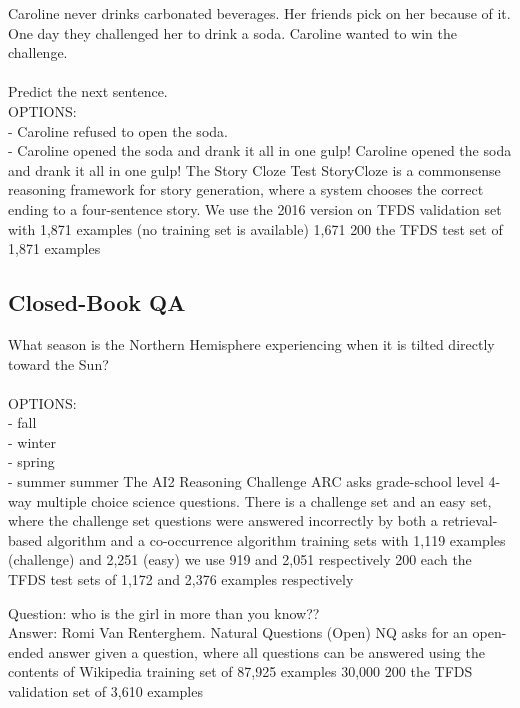 \taskio
{Caroline never drinks carbonated beverages. Her friends pick on her because of it. One day they challenged her to drink a soda. Caroline wanted to win the challenge.\\\\Predict the next sentence.\\OPTIONS:\\- Caroline refused to open the soda.\\- Caroline opened the soda and drank it all in one gulp!}
{Caroline opened the soda and drank it all in one gulp!}
{
    \taskdescription
    {The Story Cloze Test} %
    {StoryCloze} %
    {\citep{mostafazadeh-etal-2016-corpus}} %
    {is a commonsense reasoning framework for story generation, where a system chooses the correct ending to a four-sentence story. We use the 2016 version on TFDS} %
    {validation set with 1,871 examples (no training set is available)} %
    {1,671} %
    {200} %
    {the TFDS test set of 1,871 examples} %
}

\clearpage 
\subsection{Closed-Book QA}\label{appen:b-open-qa}

\taskio
{What season is the Northern Hemisphere experiencing when it is tilted directly toward the Sun?\\\\OPTIONS:\\- fall\\- winter\\- spring\\- summer}
{summer}
{
\taskdescription
    {The AI2 Reasoning Challenge} %
    {ARC} %
    {\citep{clark2018think}} %
    {asks grade-school level 4-way multiple choice science questions. There is a challenge set and an easy set, where the challenge set questions were answered incorrectly by both a retrieval-based algorithm and a co-occurrence algorithm} %
    {training sets with 1,119 examples (challenge) and 2,251 (easy)} %
    {we use 919 and 2,051 respectively} %
    {200 each} %
    {the TFDS test sets of 1,172 and 2,376 examples respectively} %
}

\taskio
{Question: who is the girl in more than you know??\\Answer:}
{Romi Van Renterghem.}
{
    \taskdescription
    {Natural Questions (Open)} %
    {NQ} %
    {\citep{orqa,kwiatkowski2019natural}} %
    {asks for an open-ended answer given a question, where all questions can be answered using the contents of Wikipedia} %
    {training set of 87,925 examples} %
    {30,000} %
    {200} %
    {the TFDS validation set of 3,610 examples} %
}

